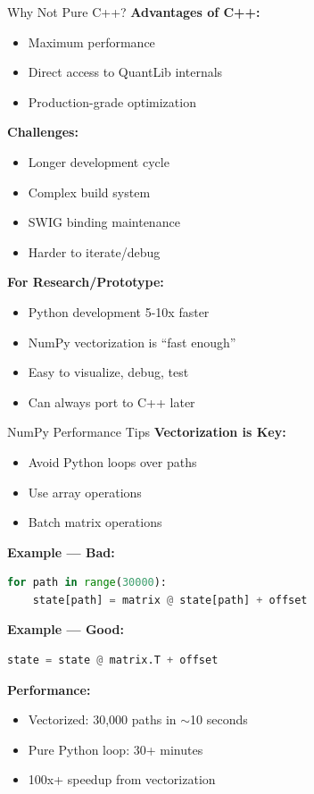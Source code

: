 \documentclass[aspectratio=169,11pt]{beamer}
\begin{document}
\begin{frame}{Why Not Pure C++?}
\textbf{Advantages of C++:}
\begin{itemize}
    \item Maximum performance
    \item Direct access to QuantLib internals
    \item Production-grade optimization
\end{itemize}

\textbf{Challenges:}
\begin{itemize}
    \item Longer development cycle
    \item Complex build system
    \item SWIG binding maintenance
    \item Harder to iterate/debug
\end{itemize}

\textbf{For Research/Prototype:}
\begin{itemize}
    \item Python development 5-10x faster
    \item NumPy vectorization is ``fast enough''
    \item Easy to visualize, debug, test
    \item Can always port to C++ later
\end{itemize}
\end{frame}

\begin{frame}[fragile]{NumPy Performance Tips}
\textbf{Vectorization is Key:}
\begin{itemize}
    \item Avoid Python loops over paths
    \item Use array operations
    \item Batch matrix operations
\end{itemize}

\textbf{Example --- Bad:}
\begin{lstlisting}[language=Python]
for path in range(30000):
    state[path] = matrix @ state[path] + offset
\end{lstlisting}

\textbf{Example --- Good:}
\begin{lstlisting}[language=Python]
state = state @ matrix.T + offset
\end{lstlisting}

\textbf{Performance:}
\begin{itemize}
    \item Vectorized: 30,000 paths in $\sim$10 seconds
    \item Pure Python loop: 30+ minutes
    \item 100x+ speedup from vectorization
\end{itemize}
\end{frame}
\end{document}
